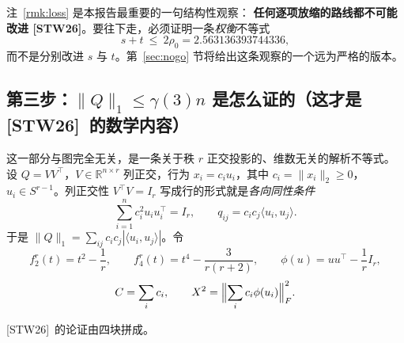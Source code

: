 \documentclass[UTF8,11pt]{ctexart}
\theoremstyle{definition}
\newcommand{\R}{\mathbb{R}}
\newcommand{\STW}{\textup{[STW26]}}
\begin{document}
注~\ref{rmk:loss} 是本报告最重要的一句结构性观察：
\textbf{任何逐项放缩的路线都不可能改进 \STW}。要往下走，必须证明一条\emph{权衡}不等式
\begin{equation}\label{eq:tradeoff}
s+t\ \le\ 2\rho_0=2.563136393744336 ,
\end{equation}
而不是分别改进 $s$ 与 $t$。第~\ref{sec:nogo} 节将给出这条观察的一个远为严格的版本。

\subsection{第三步：$\|Q\|_1\le\gamma(3)n$ 是怎么证的（这才是 \STW\ 的数学内容）}

这一部分与图完全无关，是一条关于秩 $r$ 正交投影的、维数无关的解析不等式。
设 $Q=VV^\top$，$V\in\R^{n\times r}$ 列正交，行为 $x_i=c_iu_i$，其中 $c_i=\|x_i\|_2\ge0$，
$u_i\in S^{r-1}$。列正交性 $V^\top V=I_r$ 写成行的形式就是\emph{各向同性条件}
\begin{equation}\label{eq:iso}
\sum_{i=1}^n c_i^2u_iu_i^\top=I_r,\qquad q_{ij}=c_ic_j\langle u_i,u_j\rangle .
\end{equation}
于是 $\|Q\|_1=\sum_{ij}c_ic_j|\langle u_i,u_j\rangle|$。令
\[
f_2^{r}(t)=t^2-\frac1r,\qquad f_4^{r}(t)=t^4-\frac{3}{r(r+2)},\qquad
\phi(u)=uu^\top-\frac1rI_r,
\]
\[
C=\sum_ic_i,\qquad X^2=\Bigl\|\sum_ic_i\phi(u_i)\Bigr\|_F^2 .
\]

\STW\ 的论证由四块拼成。
\end{document}
